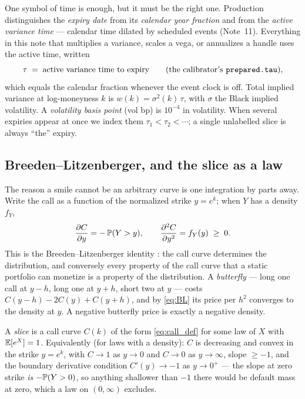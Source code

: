 \documentclass[11pt]{article}
\begin{document}
One symbol of time is enough, but it must be the right one.  Production
distinguishes the \emph{expiry date} from its \emph{calendar year fraction}
and from the \emph{active variance time} --- calendar time dilated by
scheduled events (Note~11).  Everything in this note that multiplies a
variance, scales a vega, or annualizes a handle uses the active time, written
\begin{equation}
\tau \;=\; \text{active variance time to expiry}
\qquad(\text{the calibrator's \texttt{prepared.tau}}),
\end{equation}
which equals the calendar fraction whenever the event clock is off.  Total
implied variance at log-moneyness $k$ is $w(k)=\sigma^{2}(k)\,\tau$, with
$\sigma$ the Black implied volatility.  A \emph{volatility basis point}
(vol bp) is $10^{-4}$ in volatility.  When several expiries appear at once we
index them $\tau_1<\tau_2<\cdots$; a single unlabelled slice is always ``the''
expiry.

\subsection{Breeden--Litzenberger, and the slice as a law}

The reason a smile cannot be an arbitrary curve is one integration by parts
away.  Write the call as a function of the normalized strike $y=e^{k}$; when
$Y$ has a density $f_Y$,
\begin{equation}
\frac{\partial C}{\partial y}=-\,\mathbb{P}(Y>y),
\qquad
\frac{\partial^{2} C}{\partial y^{2}}=f_Y(y)\;\ge\;0 .
\label{eq:BL}
\end{equation}
This is the Breeden--Litzenberger identity \cite{BreedenLitzenberger1978}:
the call curve determines the distribution, and conversely every property of
the call curve that a static portfolio can monetize is a property of the
distribution.  A \emph{butterfly} --- long one call at $y-h$, long one at
$y+h$, short two at $y$ --- costs $C(y-h)-2C(y)+C(y+h)$, and by
\eqref{eq:BL} its price per $h^{2}$ converges to the density at $y$.  A
negative butterfly price is exactly a negative density.

\begin{definition}
\label{def:slice}
A \emph{slice} is a call curve $C(k)$ of the form \eqref{eq:call_def} for
some law of $X$ with $\mathbb{E}[e^{X}]=1$.  Equivalently (for laws with a density):
$C$ is decreasing and convex in the strike $y=e^{k}$, with $C\to1$ as
$y\to0$ and $C\to0$ as $y\to\infty$, slope $\ge-1$, and the boundary
derivative condition $C'(y)\to-1$ as $y\to0^{+}$ --- the slope at zero
strike \emph{is} $-\mathbb{P}(Y>0)$, so anything shallower than $-1$ there would
be default mass at zero, which a law on $(0,\infty)$ excludes.
\end{definition}
\end{document}
